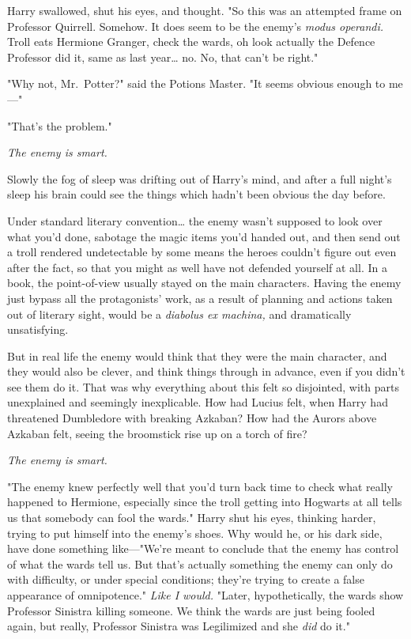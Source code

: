 Harry swallowed, shut his eyes, and thought. "So this was an attempted frame on
Professor Quirrell. Somehow. It does seem to be the enemy's \emph{modus
operandi.} Troll eats Hermione Granger, check the wards, oh look actually the
Defence Professor did it, same as last year{\ldots} no. No, that can't be
right."

"Why not, Mr.~Potter?" said the Potions Master. "It seems obvious enough to
me---"

"That's the problem."

\emph{The enemy is smart.}

Slowly the fog of sleep was drifting out of Harry's mind, and after a full
night's sleep his brain could see the things which hadn't been obvious the day
before.

Under standard literary convention{\ldots} the enemy wasn't supposed to look
over what you'd done, sabotage the magic items you'd handed out, and then send
out a troll rendered undetectable by some means the heroes couldn't figure out
even after the fact, so that you might as well have not defended yourself at
all. In a book, the point-of-view usually stayed on the main characters. Having
the enemy just bypass all the protagonists' work, as a result of planning and
actions taken out of literary sight, would be a \emph{diabolus ex machina,} and
dramatically unsatisfying.

But in real life the enemy would think that they were the main character, and
they would also be clever, and think things through in advance, even if you
didn't see them do it. That was why everything about this felt so disjointed,
with parts unexplained and seemingly inexplicable. How had Lucius felt, when
Harry had threatened Dumbledore with breaking Azkaban? How had the Aurors above
Azkaban felt, seeing the broomstick rise up on a torch of fire?

\emph{The enemy is smart.}

"The enemy knew perfectly well that you'd turn back time to check what really
happened to Hermione, especially since the troll getting into Hogwarts at all
tells us that somebody can fool the wards." Harry shut his eyes, thinking
harder, trying to put himself into the enemy's shoes. Why would he, or his dark
side, have done something like---"We're meant to conclude that the enemy has
control of what the wards tell us. But that's actually something the enemy can
only do with difficulty, or under special conditions; they're trying to create
a false appearance of omnipotence." \emph{Like I would.} "Later,
hypothetically, the wards show Professor Sinistra killing someone. We think the
wards are just being fooled again, but really, Professor Sinistra was
Legilimized and she \emph{did} do it."

